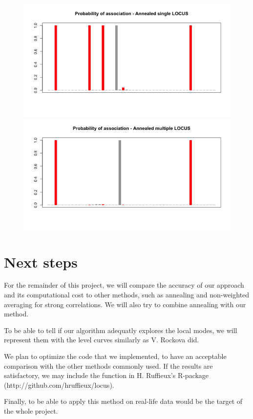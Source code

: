 \documentclass[a4paper, 11pt]{report}
\numberwithin{equation}{chapter}
\begin{document}
\begin{figure}
\begin{center}
\includegraphics[width=5in]{images/s_annealed.png}
\includegraphics[width=5in]{images/m_annealed.png}
\end{center}
\end{figure}

\newpage
\chapter{Next steps}
For the remainder of this project, we will compare the accuracy of our approach and its computational cost to other methods, such as annealing and non-weighted averaging for strong correlations. We will also try to combine annealing with our method.\cite{glob}

To be able to tell if our algorithm adequatly explores the local modes, we will represent them with the level curves similarly as V. Rockova \cite{rockova} did.

We plan to optimize the code that we implemented, to have an acceptable comparison with the other methods commonly used. If the results are satisfactory, we may include the function in H. Ruffieux's R-package (http://github.com/hruffieux/locus).

Finally, to be able to apply this method on real-life data would be the target of the whole project.
\newpage


\end{document}
